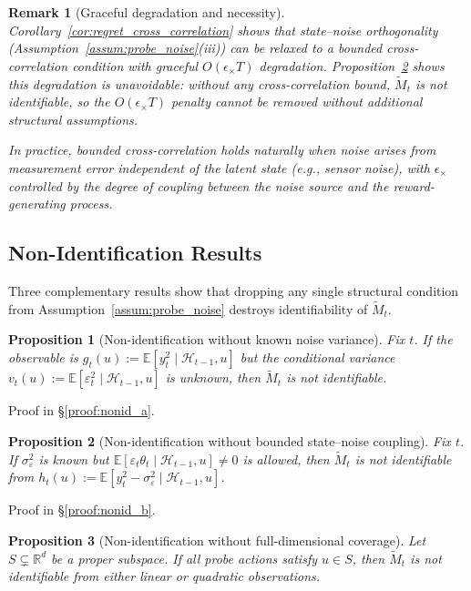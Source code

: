 \documentclass{article}
\newcommand{\R}{\mathbb{R}}
\newcommand{\E}{\mathbb{E}}
\newcommand{\cH}{\mathcal{H}}
\newtheorem{proposition}{Proposition}
\newtheorem{remark}{Remark}
\begin{document}
  \begin{remark}[Graceful degradation and necessity]
  \label{rem:cross_correlation_discussion}
  Corollary~\ref{cor:regret_cross_correlation} shows that state--noise
  orthogonality (Assumption~\ref{assum:probe_noise}(iii)) can be relaxed to a
  bounded cross-correlation condition with graceful $O(\epsilon_\times T)$
  degradation.  Proposition~\ref{prop:nonid_b} shows this degradation is
  unavoidable: without any cross-correlation bound, $\widetilde M_t$ is not
  identifiable, so the $O(\epsilon_\times T)$ penalty cannot be removed
  without additional structural assumptions.

  In practice, bounded cross-correlation holds naturally when noise arises
  from measurement error independent of the latent state (e.g., sensor noise),
  with $\epsilon_\times$ controlled by the degree of coupling between the
  noise source and the reward-generating process.
  \end{remark}

\subsection{Non-Identification Results}
\label{app:non-identification}
Three complementary results show that dropping any single structural condition from Assumption~\ref{assum:probe_noise} destroys identifiability of $\widetilde{M}_t$.

\begin{proposition}[Non-identification without known noise variance]
  \label{prop:nonid_a}
  Fix $t$. If the observable is $g_t(u) := \E[y_t^2 \mid \cH_{t-1}, u]$ but the conditional variance $v_t(u) := \E[\varepsilon_t^2 \mid \cH_{t-1}, u]$ is unknown, then $\widetilde{M}_t$ is not identifiable.
\end{proposition}

Proof in \S\ref{proof:nonid_a}.

\begin{proposition}[Non-identification without bounded state--noise coupling]
  \label{prop:nonid_b}
  Fix $t$. If $\sigma_\varepsilon^2$ is known but $\E[\varepsilon_t \theta_t \mid \cH_{t-1}, u] \neq 0$ is allowed, then $\widetilde{M}_t$ is not identifiable from $h_t(u) := \E[y_t^2 - \sigma_\varepsilon^2 \mid \cH_{t-1}, u]$.
\end{proposition}

Proof in \S\ref{proof:nonid_b}.

\begin{proposition}[Non-identification without full-dimensional coverage]
  \label{prop:nonid_c}
  Let $S \subsetneq \R^d$ be a proper subspace.  If all probe actions satisfy $u \in S$, then $\widetilde{M}_t$ is not identifiable from either linear or quadratic observations.
\end{proposition}
\end{document}
